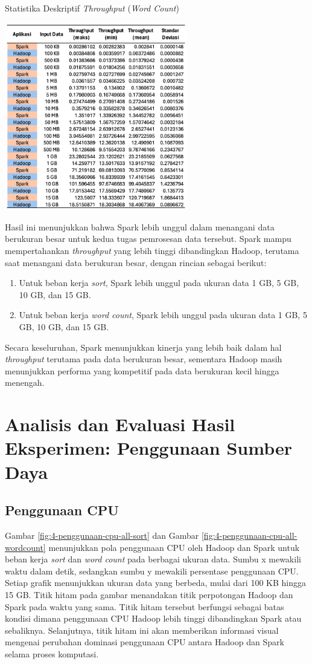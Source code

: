 \begin{table}[h]
  \centering
  \caption{Statistika Deskriptif \textit{Throughput} (\textit{Word Count})}
  \includegraphics[width=0.6\textwidth]{figures/ch04/4-wc-th-table}
  \label{table:4-wc-th-table}
\end{table}

Hasil ini menunjukkan bahwa Spark lebih unggul dalam menangani data berukuran besar untuk kedua tugas pemrosesan data tersebut. Spark mampu mempertahankan \textit{throughput} yang lebih tinggi dibandingkan Hadoop, terutama saat menangani data berukuran besar, dengan rincian sebagai berikut:
\begin{enumerate}
\item Untuk beban kerja \textit{sort}, Spark lebih unggul pada ukuran data 1 GB, 5 GB, 10 GB, dan 15 GB.
\item Untuk beban kerja \textit{word count}, Spark lebih unggul pada ukuran data 1 GB, 5 GB, 10 GB, dan 15 GB.
\end{enumerate}

Secara keseluruhan, Spark menunjukkan kinerja yang lebih baik dalam hal \textit{throughput} terutama pada data berukuran besar, sementara Hadoop masih menunjukkan performa yang kompetitif pada data berukuran kecil hingga menengah.

\newpage
\section{Analisis dan Evaluasi Hasil Eksperimen: Penggunaan Sumber Daya}
\subsection{Penggunaan CPU}
Gambar \ref{fig:4-penggunaan-cpu-all-sort} dan Gambar \ref{fig:4-penggunaan-cpu-all-wordcount} menunjukkan pola penggunaan CPU oleh Hadoop dan Spark untuk beban kerja \textit{sort} dan \textit{word count} pada berbagai ukuran data. Sumbu x mewakili waktu dalam detik, sedangkan sumbu y mewakili persentase penggunaan CPU. Setiap grafik menunjukkan ukuran data yang berbeda, mulai dari 100 KB hingga 15 GB. Titik hitam pada gambar menandakan titik perpotongan Hadoop dan Spark pada waktu yang sama. Titik hitam tersebut berfungsi sebagai batas kondisi dimana penggunaan CPU Hadoop lebih tinggi dibandingkan Spark atau sebaliknya. Selanjutnya, titik hitam ini akan memberikan informasi visual mengenai perubahan dominasi penggunaan CPU antara Hadoop dan Spark selama proses komputasi.

